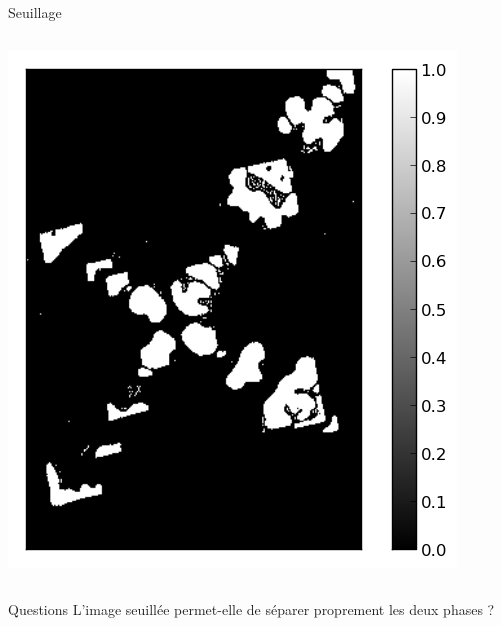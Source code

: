 \documentclass[8pt,a4paper]{beamer}
\begin{document}
\begin{frame}{Seuillage}
 \begin{columns}
\includegraphics[width=1.\textwidth]{figures/image_threshold.png}

\end{columns}
\begin{alertblock}{Questions}
L'image seuillée permet-elle de séparer proprement les deux phases ?
\end{alertblock}
\end{frame}
\end{document}
